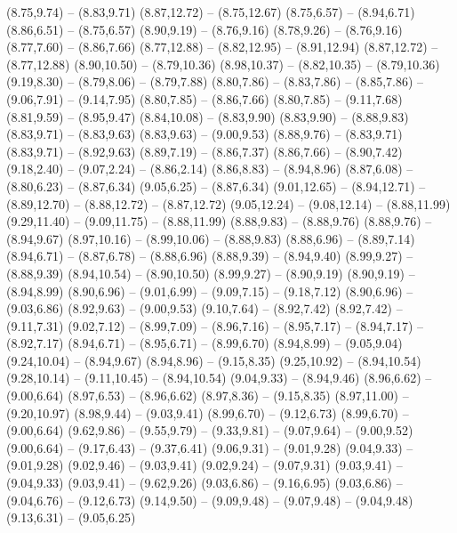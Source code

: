{  (8.75,9.74) -- (8.83,9.71)
  (8.87,12.72) -- (8.75,12.67)
  (8.75,6.57) -- (8.94,6.71)
  (8.86,6.51) -- (8.75,6.57)
  (8.90,9.19) -- (8.76,9.16)
  (8.78,9.26) -- (8.76,9.16)
  (8.77,7.60) -- (8.86,7.66)
  (8.77,12.88) -- (8.82,12.95) -- (8.91,12.94)
  (8.87,12.72) -- (8.77,12.88)
  (8.90,10.50) -- (8.79,10.36)
  (8.98,10.37) -- (8.82,10.35) -- (8.79,10.36)
  (9.19,8.30) -- (8.79,8.06) -- (8.79,7.88)
  (8.80,7.86) -- (8.83,7.86) -- (8.85,7.86) -- (9.06,7.91) -- (9.14,7.95)
  (8.80,7.85) -- (8.86,7.66)
  (8.80,7.85) -- (9.11,7.68)
  (8.81,9.59) -- (8.95,9.47)
  (8.84,10.08) -- (8.83,9.90)
  (8.83,9.90) -- (8.88,9.83)
  (8.83,9.71) -- (8.83,9.63)
  (8.83,9.63) -- (9.00,9.53)
  (8.88,9.76) -- (8.83,9.71)
  (8.83,9.71) -- (8.92,9.63)
  (8.89,7.19) -- (8.86,7.37)
  (8.86,7.66) -- (8.90,7.42)
  (9.18,2.40) -- (9.07,2.24) -- (8.86,2.14)
  (8.86,8.83) -- (8.94,8.96)
  (8.87,6.08) -- (8.80,6.23) -- (8.87,6.34)
  (9.05,6.25) -- (8.87,6.34)
  (9.01,12.65) -- (8.94,12.71) -- (8.89,12.70) -- (8.88,12.72) -- (8.87,12.72)
  (9.05,12.24) -- (9.08,12.14) -- (8.88,11.99)
  (9.29,11.40) -- (9.09,11.75) -- (8.88,11.99)
  (8.88,9.83) -- (8.88,9.76)
  (8.88,9.76) -- (8.94,9.67)
  (8.97,10.16) -- (8.99,10.06) -- (8.88,9.83)
  (8.88,6.96) -- (8.89,7.14)
  (8.94,6.71) -- (8.87,6.78) -- (8.88,6.96)
  (8.88,9.39) -- (8.94,9.40)
  (8.99,9.27) -- (8.88,9.39)
  (8.94,10.54) -- (8.90,10.50)
  (8.99,9.27) -- (8.90,9.19)
  (8.90,9.19) -- (8.94,8.99)
  (8.90,6.96) -- (9.01,6.99) -- (9.09,7.15) -- (9.18,7.12)
  (8.90,6.96) -- (9.03,6.86)
  (8.92,9.63) -- (9.00,9.53)
  (9.10,7.64) -- (8.92,7.42)
  (8.92,7.42) -- (9.11,7.31)
  (9.02,7.12) -- (8.99,7.09) -- (8.96,7.16) -- (8.95,7.17) -- (8.94,7.17) -- (8.92,7.17)
  (8.94,6.71) -- (8.95,6.71) -- (8.99,6.70)
  (8.94,8.99) -- (9.05,9.04)
  (9.24,10.04) -- (8.94,9.67)
  (8.94,8.96) -- (9.15,8.35)
  (9.25,10.92) -- (8.94,10.54)
  (9.28,10.14) -- (9.11,10.45) -- (8.94,10.54)
  (9.04,9.33) -- (8.94,9.46)
  (8.96,6.62) -- (9.00,6.64)
  (8.97,6.53) -- (8.96,6.62)
  (8.97,8.36) -- (9.15,8.35)
  (8.97,11.00) -- (9.20,10.97)
  (8.98,9.44) -- (9.03,9.41)
  (8.99,6.70) -- (9.12,6.73)
  (8.99,6.70) -- (9.00,6.64)
  (9.62,9.86) -- (9.55,9.79) -- (9.33,9.81) -- (9.07,9.64) -- (9.00,9.52)
  (9.00,6.64) -- (9.17,6.43) -- (9.37,6.41)
  (9.06,9.31) -- (9.01,9.28)
  (9.04,9.33) -- (9.01,9.28)
  (9.02,9.46) -- (9.03,9.41)
  (9.02,9.24) -- (9.07,9.31)
  (9.03,9.41) -- (9.04,9.33)
  (9.03,9.41) -- (9.62,9.26)
  (9.03,6.86) -- (9.16,6.95)
  (9.03,6.86) -- (9.04,6.76) -- (9.12,6.73)
  (9.14,9.50) -- (9.09,9.48) -- (9.07,9.48) -- (9.04,9.48)
  (9.13,6.31) -- (9.05,6.25)
}
